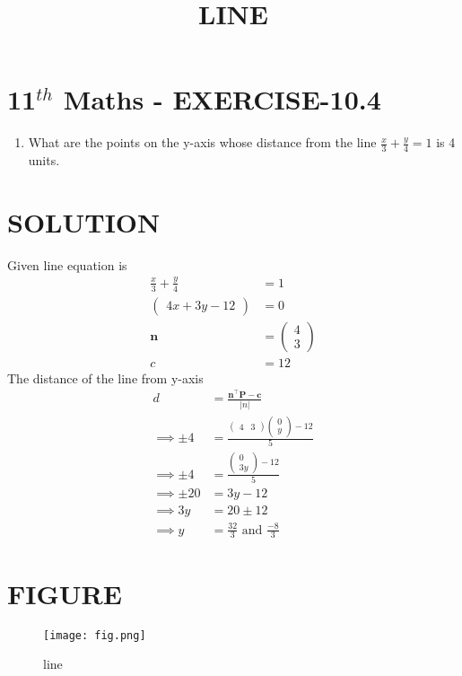\documentclass[12pt]{article}
\newcommand{\myvec}[1]{\ensuremath{\begin{pmatrix}#1\end{pmatrix}}}
\providecommand{\abs}[1]{\left\vert#1\right\vert}
\let\vec\mathbf
\begin{document}
\begin{center}
\title{\textbf{LINE}}
\date{\vspace{-5ex}} %
\maketitle
\end{center}

\section{11$^{th}$ Maths - EXERCISE-10.4}
\begin{enumerate}
\item What are the points on the y-axis whose distance from the line $\frac{x}{3}+\frac{y}{4}=1$ is 4 units.
\end{enumerate}
\section{SOLUTION}
Given line equation is
\begin{align}
\frac{x}{3}+\frac{y}{4}&=1\\
\myvec{4x+3y-12}&=0\\
\vec{n}&=\myvec{4\\3}\\
c&=12
\end{align}
The distance of the line from y-axis
\begin{align}
d&=\frac{\vec{n}^\top\vec{P}-\vec{c}}{\abs{n}}\\
\implies\pm4&=\frac{\myvec{4& 3}\myvec{0\\ y}-12}{5}\\
\implies\pm4&=\frac{\myvec{0\\ 3y}-12}{5}\\
\implies\pm20&=3y-12\\
\implies 3y&=20\pm12\\
\implies y&= \frac{32}{3}\text{ and }\frac{-8}{3}
\end{align}

\section{FIGURE}
\begin{figure}[h]
\centering
\texttt{[image: fig.png]}
\caption{line}
		\label{fig:Figure}
\end{figure}
\end{document}
